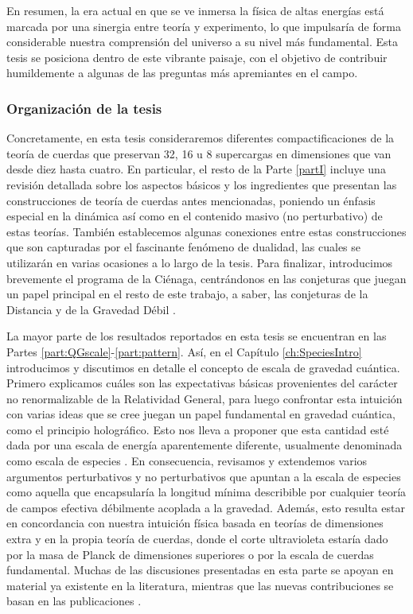 En resumen, la era actual en que se ve inmersa la física de altas energías está marcada por una sinergia entre teoría y experimento, lo que impulsaría de forma considerable nuestra comprensión del universo a su nivel más fundamental. Esta tesis se posiciona dentro de este vibrante paisaje, con el objetivo de contribuir humildemente a algunas de las preguntas más apremiantes en el campo.

\subsubsection*{Organización de la tesis}

Concretamente, en esta tesis consideraremos diferentes compactificaciones de la teoría de cuerdas que preservan 32, 16 u 8 supercargas en dimensiones que van desde diez hasta cuatro. En particular, el resto de la Parte \ref{partI} incluye una revisión detallada sobre los aspectos básicos y los ingredientes que presentan las construcciones de teoría de cuerdas antes mencionadas, poniendo un énfasis especial en la dinámica así como en el contenido masivo (no perturbativo) de estas teorías. También establecemos algunas conexiones entre estas construcciones que son capturadas por el fascinante fenómeno de dualidad, las cuales se utilizarán en varias ocasiones a lo largo de la tesis. Para finalizar, introducimos brevemente el programa de la Ciénaga, centrándonos en las conjeturas que juegan un papel principal en el resto de este trabajo, a saber, las conjeturas de la Distancia \cite{Ooguri:2006in} y de la Gravedad Débil \cite{Heidenreich:2015nta, Heidenreich:2016aqi, Montero:2016tif, Andriolo:2018lvp}.

La mayor parte de los resultados reportados en esta tesis se encuentran en las Partes \ref{part:QGscale}-\ref{part:pattern}. Así, en el Capítulo \ref{ch:SpeciesIntro} introducimos y discutimos en detalle el concepto de escala de gravedad cuántica. Primero explicamos cuáles son las expectativas básicas provenientes del carácter no renormalizable de la Relatividad General, para luego confrontar esta intuición con varias ideas que se cree juegan un papel fundamental en gravedad cuántica, como el principio holográfico. Esto nos lleva a proponer que esta cantidad esté dada por una escala de energía aparentemente diferente, usualmente denominada como escala de especies \cite{Han:2004wt, Dvali:2007hz, Dvali:2007wp}. En consecuencia, revisamos y extendemos varios argumentos perturbativos y no perturbativos que apuntan a la escala de especies como aquella que encapsularía la longitud mínima describible por cualquier teoría de campos efectiva débilmente acoplada a la gravedad. Además, esto resulta estar en concordancia con nuestra intuición física basada en teorías de dimensiones extra y en la propia teoría de cuerdas, donde el corte ultravioleta estaría dado por la masa de Planck de dimensiones superiores o por la escala de cuerdas fundamental. Muchas de las discusiones presentadas en esta parte se apoyan en material ya existente en la literatura, mientras que las nuevas contribuciones se basan en las publicaciones \cite{Castellano:2022bvr, Castellano:2023aum}.

